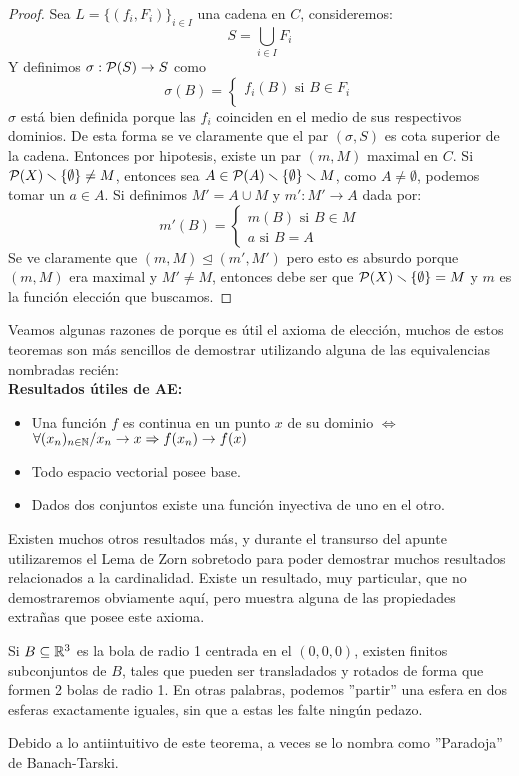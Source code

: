 \documentclass[12pt,a4paper]{book}
\begin{document}
\begin{teo}
\begin{proof}
Sea $L = \{(f_i, F_i)\}_{i \in I}$ una cadena en $C$, consideremos:
$$ S = \bigcup_{i \in I} F_i $$
Y definimos $\sigma: \P(S) \rightarrow S$ como 
$$ 
\sigma(B) = 
\begin{cases}
   f_i(B)   \text{  si } B \in F_i \\
  \end{cases}
$$
$\sigma$ está bien definida porque las $f_i$ coinciden en el medio de sus respectivos dominios. De esta forma se ve claramente que el par $(\sigma,S)$ es cota superior de la cadena. Entonces por hipotesis, existe un par $(m,M)$ maximal en $C$.
Si $\P(X)\smallsetminus \{\emptyset\} \neq M$, entonces sea $A \in \P(A)\smallsetminus \{\emptyset\} \smallsetminus M$, como $A \neq \emptyset$, podemos tomar un $a \in A$. Si definimos $ M' = A \cup M$ y $m':M' \rightarrow A$ dada por:
$$ 
m'(B) = 
\begin{cases}
   m(B)   \text{  si } B \in M \\
   a   \text{            si } B = A 
  \end{cases}
$$
Se ve claramente que $(m,M) \unlhd (m',M')$ pero esto es absurdo porque $(m,M)$ era maximal y $M' \neq M$, entonces debe ser que $\P(X)\smallsetminus \{\emptyset\} = M$ y $m$ es la función elección que buscamos.
\end{proof}
\end{teo}
Veamos algunas razones de porque es útil el axioma de elección, muchos de estos teoremas son más sencillos de demostrar utilizando alguna de las equivalencias nombradas recién:\\
\textbf{Resultados útiles de AE:}
\begin{itemize}
\item Una función $f$ es continua en un punto $x$ de su dominio $\Leftrightarrow$\\ $\forall (x_n)_{n \in \N} \slash x_n \rightarrow x \Rightarrow f(x_n) \rightarrow f(x)$
\item Todo espacio vectorial posee base.
\item Dados dos conjuntos existe una función inyectiva de uno en el otro.
\end{itemize}
Existen muchos otros resultados más, y durante el transurso del apunte utilizaremos el Lema de Zorn sobretodo para poder demostrar muchos resultados relacionados a la cardinalidad. Existe un resultado, muy particular, que no demostraremos obviamente aquí, pero muestra alguna de las propiedades extrañas que posee este axioma.
\begin{teo}
Si $B \subseteq \R^3$ es la bola de radio 1 centrada en el $(0,0,0)$, existen finitos subconjuntos de $B$, tales que pueden ser transladados y rotados de forma que formen 2 bolas de radio 1. En otras palabras, podemos ''partir'' una esfera en dos esferas exactamente iguales, sin que a estas les falte ningún pedazo.
\end{teo}
Debido a lo antiintuitivo de este teorema, a veces se lo nombra como ''Paradoja'' de Banach-Tarski. 
\ifx\isEmbedded\undefined
\end{document}
